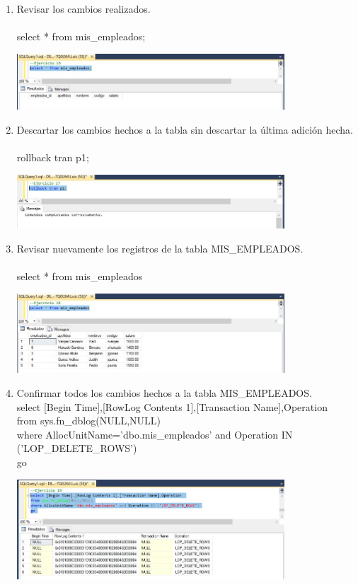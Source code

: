 \begin{enumerate}[1.]
	\item Revisar los cambios realizados.
          \\
	\\select * from mis\_empleados;
	\begin{center}
	\includegraphics[width=10cm]{./Imagenes/1ejer16} 
	\end{center}

	\item Descartar los cambios hechos a la tabla sin descartar la última adición hecha.
          \\
	\\rollback tran p1;
	\begin{center}
	\includegraphics[width=10cm]{./Imagenes/1ejer17} 
	\end{center}

	\item Revisar nuevamente los registros de la tabla MIS\_EMPLEADOS.
          \\
	\\select * from mis\_empleados
	\begin{center}
	\includegraphics[width=10cm]{./Imagenes/1ejer18} 
	\end{center}

	\item Confirmar todos los cambios hechos a la tabla MIS\_EMPLEADOS.
          \\select [Begin Time],[RowLog Contents 1],[Transaction Name],Operation 
          \\from sys.fn\_dblog(NULL,NULL)
          \\where AllocUnitName='dbo.mis\_empleados' and Operation IN ('LOP\_DELETE\_ROWS')
          \\go
	\begin{center}
	\includegraphics[width=10cm]{./Imagenes/1ejer19} 
	\end{center}


\end{enumerate}
